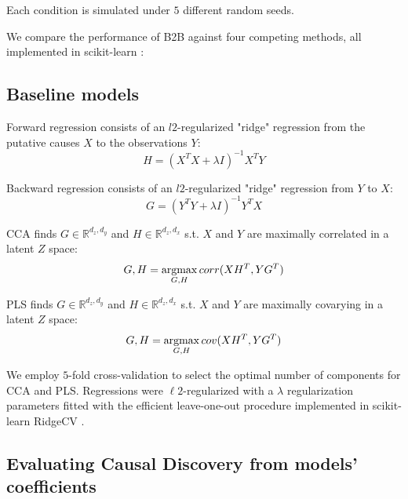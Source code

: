 Each condition is simulated under $5$ different random seeds.

We compare the performance of B2B against four competing methods, all
implemented in scikit-learn \citep{scikit}:
%

\subsection{Baseline models}

Forward regression consists of an $l2$-regularized "ridge" regression from the
putative causes $X$ to the observations $Y$: \begin{equation} H = (X^T X
+\lambda I)^{-1} X^T Y \end{equation}

Backward regression consists of an $l2$-regularized "ridge" regression from $Y$
to $X$: \begin{equation} G = (Y^T Y +\lambda I)^{-1} Y^T X \end{equation}

CCA finds $G\in\mathbb{R}^{d_z, d_y}$ and $H\in\mathbb{R}^{d_z, d_x}$
s.t.
$X$ and $Y$ are maximally correlated in a latent $Z$ space:
\begin{equation} G,H = \operatorname*{argmax}_{G,H} corr(XH^T, YG^T) \end{equation}

PLS finds $G\in\mathbb{R}^{d_z, d_y}$ and $H\in\mathbb{R}^{d_z, d_x}$
s.t.
$X$ and $Y$ are maximally covarying in a latent $Z$ space:
\begin{equation} G,H = \operatorname*{argmax}_{G,H} cov(XH^T, YG^T) \end{equation}

We employ $5$-fold cross-validation to select the optimal number of components
for CCA and PLS. Regressions were $\ell2$-regularized with a $\lambda$ regularization
parameters fitted with the efficient leave-one-out procedure implemented in
scikit-learn RidgeCV \citep{scikit}.

\subsection{Evaluating Causal Discovery from models' coefficients}

